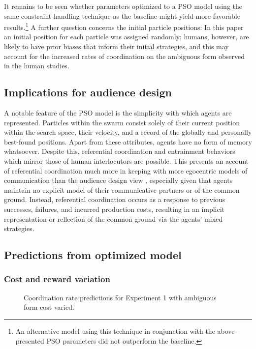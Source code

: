\documentclass[a4paper,11pt]{article}
\begin{document}
It remains to be seen whether parameters optimized to a PSO model using the same constraint handling technique as the baseline might yield more favorable results.\footnote{An alternative model using this technique in conjunction with the above-presented PSO parameters did not outperform the baseline.} A further question concerns the initial particle positions: In this paper an initial position for each particle was assigned randomly; humans, however, are likely to have prior biases that inform their initial strategies, and this may account for the increased rates of coordination on the ambiguous form observed in the human studies.

\subsection{Implications for audience design}
A notable feature of the PSO model is the simplicity with which agents are represented. Particles within the swarm consist solely of their current position within the search space, their velocity, and a record of the globally and personally best-found positions. Apart from these attributes, agents have no form of memory whatsoever. Despite this, referential coordination and entrainment behaviors which mirror those of human interlocutors are possible. This presents an account of referential coordination much more in keeping with more egocentric models of communication \cite{horton1996} than the audience design view \cite{clark1982}, especially given that agents maintain no explicit model of their communicative partners or of the common ground. Instead, referential coordination occurs as a response to previous successes, failures, and incurred production costs, resulting in an implicit representation or reflection of the common ground via the agents' mixed strategies. 


\subsection{Predictions from optimized model}
\subsubsection{Cost and reward variation}

\begin{figure}[t]
\centering
\scalebox{.475}{}
\caption{Coordination rate predictions for Experiment 1 with ambiguous form cost varied.}
\label{fig:3}
\end{figure}
\end{document}
